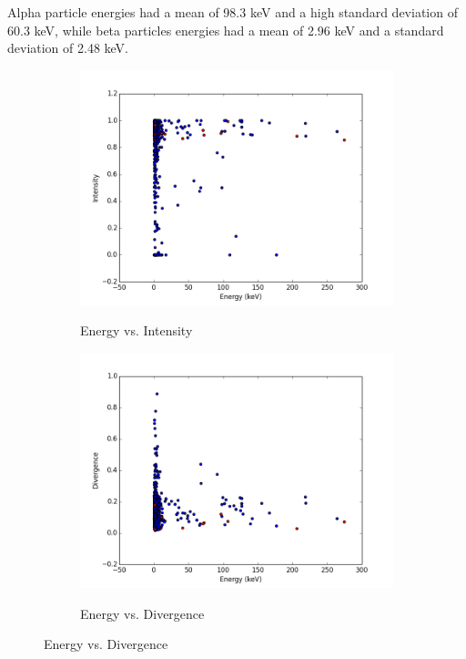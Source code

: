 \documentclass[notitlepage]{article}
\begin{document}
Alpha particle energies had a mean of 98.3 keV and a high standard deviation of 60.3 keV, while beta particles energies had a mean of 2.96 keV and a standard deviation of 2.48 keV.

\begin{figure}[h!]
\centering
\ContinuedFloat 
\begin{subfigure}{.45\textwidth}
  \centering
  \includegraphics[width=\textwidth]{energyintensity}
  \label{fig:energyintensity}
  \caption{Energy vs. Intensity}
\end{subfigure}
\begin{subfigure}{.45\textwidth}
  \centering
  \includegraphics[width=\textwidth]{energydivergence}
  \label{fig:energydivergence}
  \caption{Energy vs. Divergence}
\end{subfigure}
\end{figure}
\end{document}
